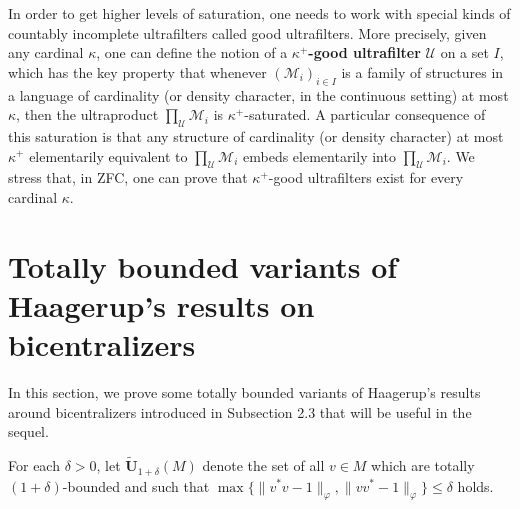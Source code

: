 \documentclass[12pt]{amsart}
\theoremstyle{definition}
\def\cal{\mathcal}
\def\u{\mathsf 1}
\def \u{\mathcal U}
\begin{document}
In order to get higher levels of saturation, one needs to work with special kinds of countably incomplete ultrafilters called good ultrafilters.  More precisely, given any cardinal $\kappa$, one can define the notion of a \textbf{$\kappa^+$-good ultrafilter} $\u$ on a set $I$, which has the key property that whenever $(\cal M_i)_{i\in I}$ is a family of structures in a language of cardinality (or density character, in the continuous setting) at most $\kappa$, then the ultraproduct $\prod_\u \cal M_i$ is $\kappa^+$-saturated.  A particular consequence of this saturation is that any structure of cardinality (or density character) at most $\kappa^+$ elementarily equivalent to $\prod_\u \cal M_i$ embeds elementarily into $\prod_\u \cal M_i$.  We stress that, in ZFC, one can prove that $\kappa^+$-good ultrafilters exist for every cardinal $\kappa$.

\section{Totally bounded variants of Haagerup's results on bicentralizers}\label{sec tb variant of Haagerup}

In this section, we prove some totally bounded variants of Haagerup's results around bicentralizers introduced in Subsection 2.3 that will be useful in the sequel.

For each $\delta>0$, let $\tilde{\mathbf{U}}_{1+\delta}(M)$ denote the set of all $v\in M$ which are totally $(1+\delta)$-bounded and such that $\max\{\|v^*v-1\|_{\varphi},\|vv^*-1\|_{\varphi}\}\le \delta$ holds.
\end{document}
